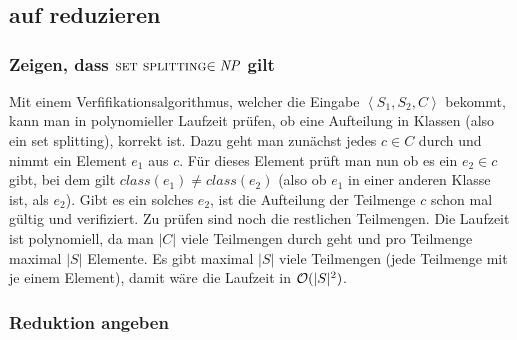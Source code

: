 \documentclass[a4paper]{article}
\begin{document}
	\section{}
		\subsection{\threesat auf \setsplit reduzieren}
			\subsubsection{Zeigen, dass $\setsplit\in\np$ gilt}
			Mit einem Verfifikationsalgorithmus, welcher die Eingabe $\left\langle S_1, S_2, C \right\rangle$ bekommt, kann man in polynomieller Laufzeit prüfen, ob eine Aufteilung in Klassen (also ein set splitting), korrekt ist.\n
			Dazu geht man zunächst jedes $c\in C$ durch und nimmt ein Element $e_1$ aus $c$.
			Für dieses Element prüft man nun ob es ein $e_2\in c$ gibt, bei dem gilt $class(e_1)\neq class(e_2)$ (also ob $e_1$ in einer anderen Klasse ist, als $e_2$).
			Gibt es ein solches $e_2$, ist die Aufteilung der Teilmenge $c$ schon mal gültig und verifiziert.
			Zu prüfen sind noch die restlichen Teilmengen.\n
			Die Laufzeit ist polynomiell, da man $|C|$ viele Teilmengen durch geht und pro Teilmenge maximal $|S|$ Elemente. Es gibt maximal $|S|$ viele Teilmengen (jede Teilmenge mit je einem Element), damit wäre die Laufzeit in $\mathcal{O}(|S|^2)$.
			\subsubsection{Reduktion angeben}
		\subsection{}
\end{document}
